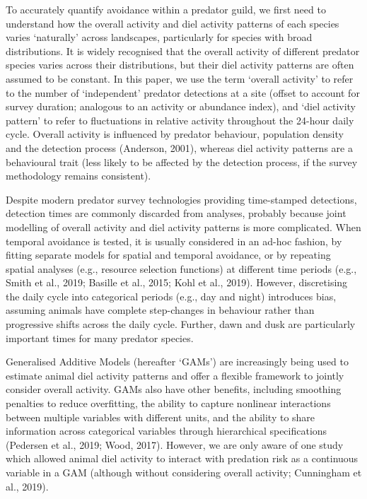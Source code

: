 \documentclass[]{elsarticle} %
\begin{document}
To accurately quantify avoidance within a predator guild, we first need to understand how the overall activity and diel activity patterns of each species varies `naturally' across landscapes, particularly for species with broad distributions. It is widely recognised that the overall activity of different predator species varies across their distributions, but their diel activity patterns are often assumed to be constant. In this paper, we use the term `overall activity' to refer to the number of `independent' predator detections at a site (offset to account for survey duration; analogous to an activity or abundance index), and `diel activity pattern' to refer to fluctuations in relative activity throughout the 24-hour daily cycle. Overall activity is influenced by predator behaviour, population density and the detection process (Anderson, 2001), whereas diel activity patterns are a behavioural trait (less likely to be affected by the detection process, if the survey methodology remains consistent).

Despite modern predator survey technologies providing time-stamped detections, detection times are commonly discarded from analyses, probably because joint modelling of overall activity and diel activity patterns is more complicated. When temporal avoidance is tested, it is usually considered in an ad-hoc fashion, by fitting separate models for spatial and temporal avoidance, or by repeating spatial analyses (e.g., resource selection functions) at different time periods (e.g., Smith et al., 2019; Basille et al., 2015; Kohl et al., 2019). However, discretising the daily cycle into categorical periods (e.g., day and night) introduces bias, assuming animals have complete step-changes in behaviour rather than progressive shifts across the daily cycle. Further, dawn and dusk are particularly important times for many predator species.

Generalised Additive Models (hereafter `GAMs') are increasingly being used to estimate animal diel activity patterns and offer a flexible framework to jointly consider overall activity. GAMs also have other benefits, including smoothing penalties to reduce overfitting, the ability to capture nonlinear interactions between multiple variables with different units, and the ability to share information across categorical variables through hierarchical specifications (Pedersen et al., 2019; Wood, 2017). However, we are only aware of one study which allowed animal diel activity to interact with predation risk as a continuous variable in a GAM (although without considering overall activity; Cunningham et al., 2019).
\end{document}
